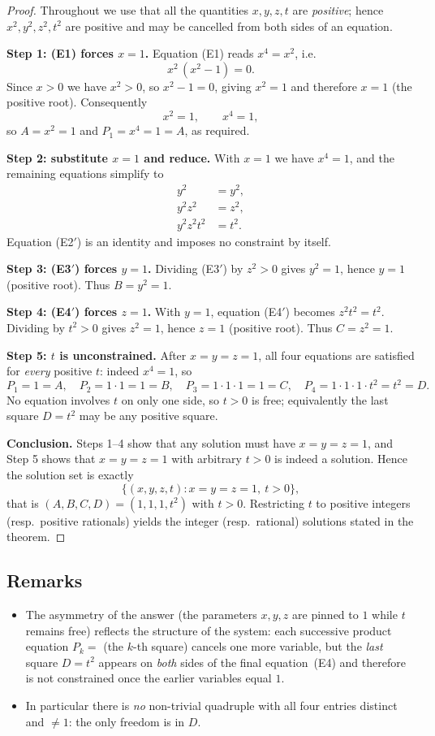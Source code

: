 \documentclass{amsart}
\begin{document}
\begin{proof}
Throughout we use that all the quantities $x,y,z,t$ are \emph{positive}; hence
$x^2,y^2,z^2,t^2$ are positive and may be cancelled from both sides of an equation.

\medskip
\noindent\textbf{Step 1: (E1) forces $x=1$.}
Equation (E1) reads $x^4=x^2$, i.e.
\[
x^2\,(x^2-1)=0 .
\]
Since $x>0$ we have $x^2>0$, so $x^2-1=0$, giving $x^2=1$ and therefore $x=1$
(the positive root). Consequently
\[
x^2=1,\qquad x^4=1 ,
\]
so $A=x^2=1$ and $P_1=x^4=1=A$, as required.

\medskip
\noindent\textbf{Step 2: substitute $x=1$ and reduce.}
With $x=1$ we have $x^4=1$, and the remaining equations simplify to
\begin{align}
y^2 &= y^2, \tag{E2$'$}\\
y^2 z^2 &= z^2, \tag{E3$'$}\\
y^2 z^2 t^2 &= t^2. \tag{E4$'$}
\end{align}
Equation (E2$'$) is an identity and imposes no constraint by itself.

\medskip
\noindent\textbf{Step 3: (E3$'$) forces $y=1$.}
Dividing (E3$'$) by $z^2>0$ gives $y^2=1$, hence $y=1$ (positive root).
Thus $B=y^2=1$.

\medskip
\noindent\textbf{Step 4: (E4$'$) forces $z=1$.}
With $y=1$, equation (E4$'$) becomes $z^2 t^2=t^2$. Dividing by $t^2>0$ gives
$z^2=1$, hence $z=1$ (positive root). Thus $C=z^2=1$.

\medskip
\noindent\textbf{Step 5: $t$ is unconstrained.}
After $x=y=z=1$, all four equations are satisfied for \emph{every} positive $t$:
indeed $x^4=1$, so
\[
P_1=1=A,\quad P_2=1\cdot 1=1=B,\quad P_3=1\cdot1\cdot1=1=C,\quad
P_4=1\cdot1\cdot1\cdot t^2=t^2=D .
\]
No equation involves $t$ on only one side, so $t>0$ is free; equivalently the last
square $D=t^2$ may be any positive square.

\medskip
\noindent\textbf{Conclusion.}
Steps 1--4 show that any solution must have $x=y=z=1$, and Step 5 shows that
$x=y=z=1$ with arbitrary $t>0$ is indeed a solution. Hence the solution set is exactly
\[
\{(x,y,z,t):x=y=z=1,\ t>0\},
\]
that is $(A,B,C,D)=(1,1,1,t^2)$ with $t>0$. Restricting $t$ to positive integers
(resp.\ positive rationals) yields the integer (resp.\ rational) solutions stated in
the theorem.
\end{proof}

\subsection*{Remarks}
\begin{itemize}
\item The asymmetry of the answer (the parameters $x,y,z$ are pinned to $1$ while $t$
remains free) reflects the structure of the system: each successive product equation
$P_{k}=$ (the $k$-th square) cancels one more variable, but the \emph{last} square
$D=t^2$ appears on \emph{both} sides of the final equation~(E4) and therefore is not
constrained once the earlier variables equal $1$.
\item In particular there is \emph{no} non-trivial quadruple with all four entries
distinct and $\neq 1$: the only freedom is in $D$.
\end{itemize}
\end{document}

